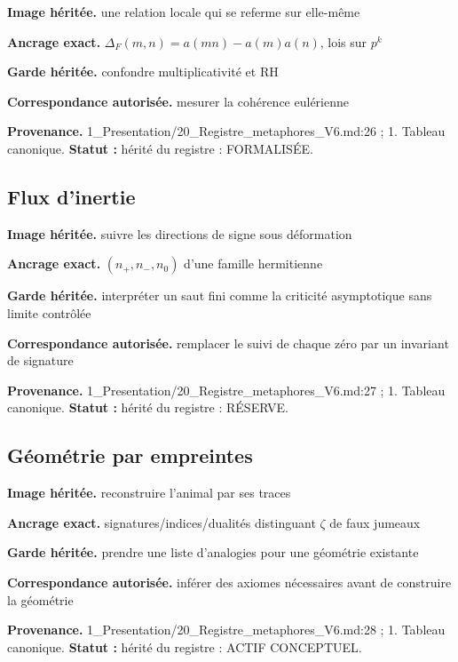 \documentclass[
  9pt,
  a4paper,
]{article}
\begin{document}
\textbf{Image héritée.} une relation locale qui se referme sur elle-même

\textbf{Ancrage exact.} \(\Delta_F(m,n)=a(mn)-a(m)a(n)\), lois sur
\(p^k\)

\textbf{Garde héritée.} confondre multiplicativité et RH

\textbf{Correspondance autorisée.} mesurer la cohérence eulérienne

\textbf{Provenance.} 1\_Presentation/20\_Registre\_metaphores\_V6.md:26
; 1. Tableau canonique. \textbf{Statut :} hérité du registre :
FORMALISÉE.

\hypertarget{flux-dinertie}{%
\subsection{Flux d'inertie}\label{flux-dinertie}}

\textbf{Image héritée.} suivre les directions de signe sous déformation

\textbf{Ancrage exact.} \((n_+,n_-,n_0)\) d'une famille hermitienne

\textbf{Garde héritée.} interpréter un saut fini comme la criticité
asymptotique sans limite contrôlée

\textbf{Correspondance autorisée.} remplacer le suivi de chaque zéro par
un invariant de signature

\textbf{Provenance.} 1\_Presentation/20\_Registre\_metaphores\_V6.md:27
; 1. Tableau canonique. \textbf{Statut :} hérité du registre : RÉSERVE.

\hypertarget{guxe9omuxe9trie-par-empreintes}{%
\subsection{Géométrie par
empreintes}\label{guxe9omuxe9trie-par-empreintes}}

\textbf{Image héritée.} reconstruire l'animal par ses traces

\textbf{Ancrage exact.} signatures/indices/dualités distinguant
\(\zeta\) de faux jumeaux

\textbf{Garde héritée.} prendre une liste d'analogies pour une géométrie
existante

\textbf{Correspondance autorisée.} inférer des axiomes nécessaires avant
de construire la géométrie

\textbf{Provenance.} 1\_Presentation/20\_Registre\_metaphores\_V6.md:28
; 1. Tableau canonique. \textbf{Statut :} hérité du registre : ACTIF
CONCEPTUEL.
\end{document}
